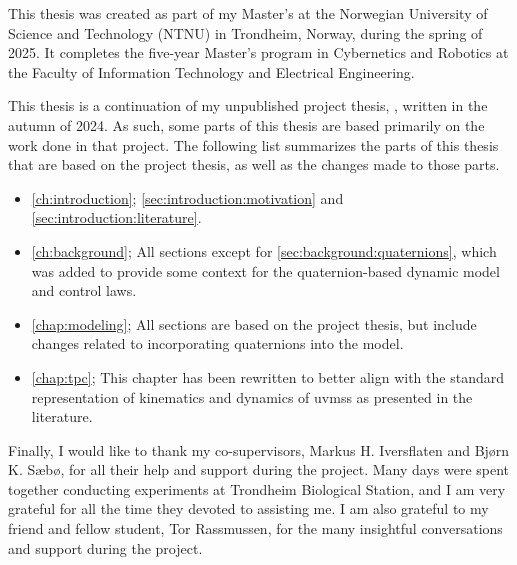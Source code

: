 This thesis was created as part of my Master's at the Norwegian University of Science and Technology (NTNU) in Trondheim, Norway, during the spring of 2025. It completes the five-year Master's program in Cybernetics and Robotics at the Faculty of Information Technology and Electrical Engineering.

This thesis is a continuation of my unpublished project thesis, , written in the autumn of 2024. As such, some parts of this thesis are based primarily on the work done in that project. The following list
summarizes the parts of this thesis that are based on the project thesis, as well as the changes made to those parts.

\begin{itemize}
    \item \autoref{ch:introduction}; \autoref{sec:introduction:motivation} and \autoref{sec:introduction:literature}.
    \item \autoref{ch:background}; All sections except for \autoref{sec:background:quaternions}, which was added to provide some context for the quaternion-based dynamic model and control laws.
    \item \autoref{chap:modeling}; All sections are based on the project thesis, but include changes related to incorporating quaternions into the model.
    \item \autoref{chap:tpc}; This chapter has been rewritten to better align with the standard representation of kinematics and dynamics of \glspl{uvms} as presented in the literature.
\end{itemize}

Finally, I would like to thank my co-supervisors, Markus H. Iversflaten and Bjørn K. Sæbø, for all their help and support during the project. Many days were spent together conducting experiments at Trondheim Biological Station, and I am very grateful for all the time they devoted to assisting me. I am also grateful to my friend and fellow student, Tor Rassmussen, for the many insightful conversations and support during the project.
